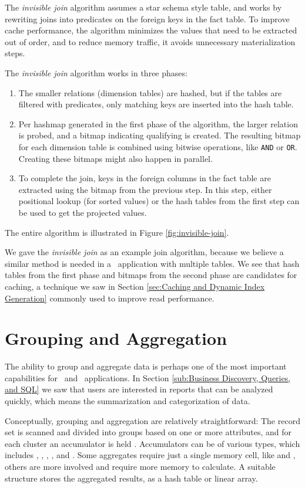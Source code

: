 The \textit{invisible join} algorithm assumes a star schema style table, and works by rewriting joins into predicates on the foreign keys in the fact table. To improve cache performance, the algorithm minimizes the values that need to be extracted out of order, and to reduce memory traffic, it avoids unnecessary materialization steps. 

The \textit{invisible join} algorithm works in three phases:
\begin{enumerate}
  \item The smaller relations (dimension tables) are hashed, but if the tables are filtered with predicates, only matching keys are inserted into the hash table.
  \item Per hashmap generated in the first phase of the algorithm, the larger relation is probed, and a bitmap indicating qualifying is created. The resulting bitmap for each dimension table is combined using bitwise operations, like \texttt{AND} or \texttt{OR}. Creating these bitmaps might also happen in parallel. 
  \item To complete the join, keys in the foreign columns in the fact table are extracted using the bitmap from the previous step. In this step, either positional lookup (for sorted values) or the hash tables from the first step can be used to get the projected values.
\end{enumerate}
The entire algorithm is illustrated in Figure \ref{fig:invisible-join}.

We gave the \textit{invisible join} as an example join algorithm, because we believe a similar method is needed in a \bd~application with multiple tables. We see that hash tables from the first phase and bitmaps from the second phase are candidates for caching, a technique we saw in Section \ref{sec:Caching and Dynamic Index Generation} commonly used to improve read performance.

\section{Grouping and Aggregation}
\label{sec:Grouping and Aggregation}
The ability to group and aggregate data is perhaps one of the most important capabilities for \bi~and \bd~applications. In Section \ref{sub:Business Discovery, Queries, and SQL} we saw that users are interested in reports that can be analyzed quickly, which means the summarization and categorization of data.

Conceptually, grouping and aggregation are relatively straightforward: The record set is scanned and divided into groups based on one or more attributes, and for each cluster an accumulator is held \cite{Bratbergsengen2015-ed}. Accumulators can be of various types, which includes , , , , and . Some aggregates require just a single memory cell, like  and , others are more involved and require more memory to calculate. A suitable structure stores the aggregated results, as a hash table or linear array. 

